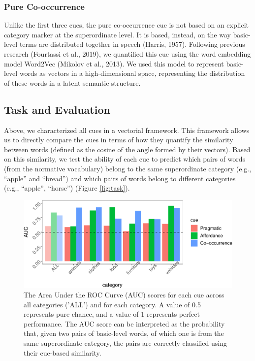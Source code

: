 \documentclass[english,,man,floatsintext]{apa6}
\begin{document}
\hypertarget{pure-co-occurrence}{%
\subsubsection{Pure Co-occurrence}\label{pure-co-occurrence}}

Unlike the first three cues, the pure co-occurrence cue is not based on an explicit category marker at the superordinate level. It is based,
instead, on the way basic-level terms are distributed together in speech (Harris, 1957). Following previous research (Fourtassi et al., 2019), we quantified this cue using the word embedding model Word2Vec (Mikolov et al., 2013). We used this model to represent basic-level words as vectors in a high-dimensional space, representing the distribution of these words in a latent semantic structure.

\hypertarget{task-and-evaluation}{%
\subsection{Task and Evaluation}\label{task-and-evaluation}}

Above, we characterized all cues in a vectorial framework. This
framework allows us to directly compare the cues in terms of how they
quantify the similarity between words (defined as the cosine of the
angle formed by their vectors). Based on this similarity, we test the
ability of each cue to predict which pairs of words (from the normative vocabulary) belong to the same superordinate category (e.g., \enquote{apple} and \enquote{bread}) and which pairs
of words belong to different categories (e.g., \enquote{apple}, \enquote{horse})
(Figure \ref{fig:task}).

\begin{figure}[h]

{\centering \includegraphics{cogsci_journal_files/figure-latex/data-all-1} 

}

\caption{\label{fig:data-all} The Area Under the ROC Curve (AUC) scores for each cue across all categories ('ALL') and for each category. A value of 0.5 represents pure chance, and a value of 1 represents perfect performance. The AUC score can be interpreted as the probability that, given two pairs of basic-level words, of which one is from the same superordinate category, the pairs are correctly classified using their  cue-based similarity.}\label{fig:data-all}
\end{figure}
\end{document}
